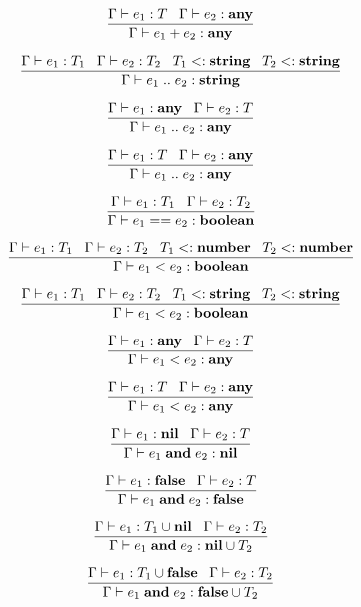 \[
\dfrac{\Gamma \vdash e_{1}:T \;\;\;
       \Gamma \vdash e_{2}:\mathbf{any}}
      {\Gamma \vdash e_{1} + e_{2}:\mathbf{any}}
\]

\[
\dfrac{\Gamma \vdash e_{1}:T_{1} \;\;\;
       \Gamma \vdash e_{2}:T_{2} \;\;\;
       T_{1} <: \mathbf{string} \;\;\;
       T_{2} <: \mathbf{string}}
      {\Gamma \vdash e_{1} \; {..} \; e_{2}:\mathbf{string}}
\]

\[
\dfrac{\Gamma \vdash e_{1}:\mathbf{any} \;\;\;
       \Gamma \vdash e_{2}:T}
      {\Gamma \vdash e_{1} \; {..} \; e_{2}:\mathbf{any}}
\]

\[
\dfrac{\Gamma \vdash e_{1}:T \;\;\;
       \Gamma \vdash e_{2}:\mathbf{any}}
      {\Gamma \vdash e_{1} \; {..} \; e_{2}:\mathbf{any}}
\]

\[
\dfrac{\Gamma \vdash e_{1}:T_{1} \;\;\;
       \Gamma \vdash e_{2}:T_{2}}
      {\Gamma \vdash e_{1} == e_{2}:\mathbf{boolean}}
\]

\[
\dfrac{\Gamma \vdash e_{1}:T_{1} \;\;\;
       \Gamma \vdash e_{2}:T_{2} \;\;\;
       T_{1} <: \mathbf{number} \;\;\;
       T_{2} <: \mathbf{number}}
      {\Gamma \vdash e_{1} < e_{2}:\mathbf{boolean}}
\]

\[
\dfrac{\Gamma \vdash e_{1}:T_{1} \;\;\;
       \Gamma \vdash e_{2}:T_{2} \;\;\;
       T_{1} <: \mathbf{string} \;\;\;
       T_{2} <: \mathbf{string}}
      {\Gamma \vdash e_{1} < e_{2}:\mathbf{boolean}}
\]

\[
\dfrac{\Gamma \vdash e_{1}:\mathbf{any} \;\;\;
       \Gamma \vdash e_{2}:T}
      {\Gamma \vdash e_{1} < e_{2}:\mathbf{any}}
\]

\[
\dfrac{\Gamma \vdash e_{1}:T \;\;\;
       \Gamma \vdash e_{2}:\mathbf{any}}
      {\Gamma \vdash e_{1} < e_{2}:\mathbf{any}}
\]

\[
\dfrac{\Gamma \vdash e_{1}:\mathbf{nil} \;\;\;
       \Gamma \vdash e_{2}:T}
      {\Gamma \vdash e_{1} \; \mathbf{and} \; e_{2}:\mathbf{nil}}
\]

\[
\dfrac{\Gamma \vdash e_{1}:\mathbf{false} \;\;\;
       \Gamma \vdash e_{2}:T}
      {\Gamma \vdash e_{1} \; \mathbf{and} \; e_{2}:\mathbf{false}}
\]

\[
\dfrac{\Gamma \vdash e_{1}:T_{1} \cup \mathbf{nil} \;\;\;
       \Gamma \vdash e_{2}:T_{2}}
      {\Gamma \vdash e_{1} \; \mathbf{and} \; e_{2}:\mathbf{nil} \cup T_{2}}
\]

\[
\dfrac{\Gamma \vdash e_{1}:T_{1} \cup \mathbf{false} \;\;\;
       \Gamma \vdash e_{2}:T_{2}}
      {\Gamma \vdash e_{1} \; \mathbf{and} \; e_{2}:\mathbf{false} \cup T_{2}}
\]

